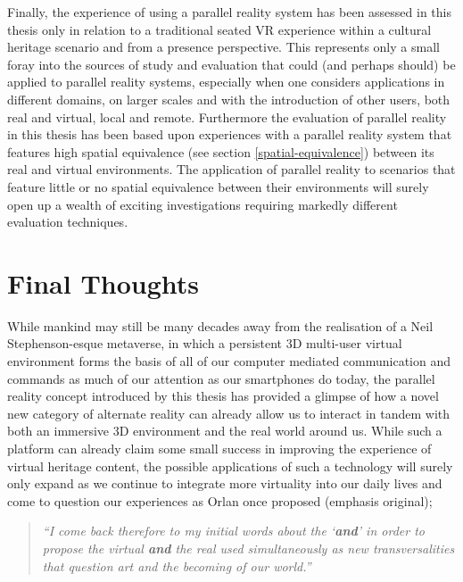 Finally, the experience of using a parallel reality system has been assessed in this thesis only in relation to a traditional seated VR experience within a cultural heritage scenario and from a presence perspective. This represents only a small foray into the sources of study and evaluation that could (and perhaps should) be applied to parallel reality systems, especially when one considers applications in different domains, on larger scales and with the introduction of other users, both real and virtual, local and remote. Furthermore the evaluation of parallel reality in this thesis has been based upon experiences with a parallel reality system that features high spatial equivalence (see section \ref{spatial-equivalence}) between its real and virtual environments. The application of parallel reality to scenarios that feature little or no spatial equivalence between their environments will surely open up a wealth of exciting investigations requiring markedly different evaluation techniques.


\section{Final Thoughts}

While mankind may still be many decades away from the realisation of a Neil Stephenson-esque metaverse, in which a persistent 3D multi-user virtual environment forms the basis of all of our computer mediated communication and commands as much of our attention as our smartphones do today, the parallel reality concept introduced by this thesis has provided a glimpse of how a novel new category of alternate reality can already allow us to interact in tandem with both an immersive 3D environment and the real world around us. While such a platform can already claim some small success in improving the experience of virtual heritage content, the possible applications of such a technology will surely only expand as we continue to integrate more virtuality into our daily lives and come to question our experiences as Orlan once proposed (emphasis original);

\begin{quote}
	\textit{``I come back therefore to my initial words about the `\textbf{and}' in order to propose the virtual \textbf{and} the real used simultaneously as new transversalities that question art and the becoming of our world.''}~\cite{Orlan2002}
\end{quote}

